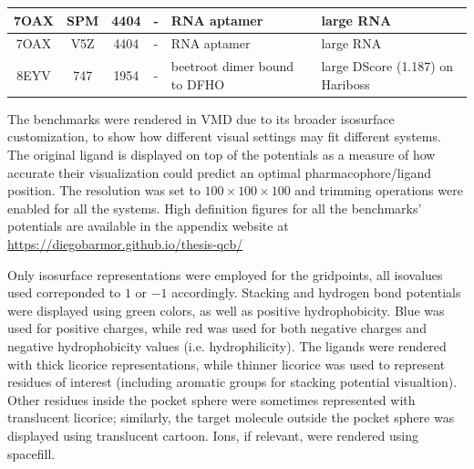 \begin{table}[H]
\begin{tabular}{ccccp{1.5in}p{1.5in}}
      7OAX & SPM     & 4404  & -    & RNA aptamer                                                 & large RNA                                               \\ \hline
      7OAX & V5Z     & 4404  & -    & RNA aptamer                                                 & large RNA                                               \\ \hline
      8EYV & 747     & 1954  & -    & beetroot dimer bound to DFHO                                & large DScore (1.187) on Hariboss                        \\ \hline
    \end{tabular}
  \end{table}

  The benchmarks were rendered in VMD due to its broader isosurface customization, to show how different visual settings may fit different systems. The original ligand is displayed on top of the potentials as a measure of how accurate their visualization could predict an optimal pharmacophore/ligand position. The resolution was set to $100 \times 100 \times 100$ and trimming operations were enabled for all the systems. High definition figures for all the benchmarks' potentials are available in the appendix website at \url{https://diegobarmor.github.io/thesis-qcb/}

  Only isosurface representations were employed for the gridpoints, all isovalues used correponded to $1$ or $-1$ accordingly. Stacking and hydrogen bond potentials were displayed using green colors, as well as positive hydrophobicity. Blue was used for positive charges, while red was used for both negative charges and negative hydrophobicity values (i.e. hydrophilicity). The ligands were rendered with thick licorice representations, while thinner licorice was used to represent residues of interest (including aromatic groups for stacking potential visualtion). Other residues inside the pocket sphere were sometimes represented with translucent licorice; similarly, the target molecule outside the pocket sphere was displayed using translucent cartoon. Ions, if relevant, were rendered using spacefill.

